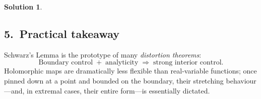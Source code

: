 \documentclass[12pt]{article}
\theoremstyle{definition} %
\newtheorem{solution}{Solution}
\theoremstyle{plain} %
\begin{document}
\begin{solution}
   \bigskip
   \subsection*{5.\ Practical takeaway}
   Schwarz’s Lemma is the prototype of many \emph{distortion theorems}:
   \[
      \text{Boundary control} \;+\; \text{analyticity} \;\Longrightarrow\; \text{strong interior control}.
   \]
   Holomorphic maps are dramatically less flexible than real‐variable functions; once pinned down at a point and bounded on the boundary, their stretching behaviour—and, in extremal cases, their entire form—is essentially dictated.
   
   \end{solution}
\end{document}
